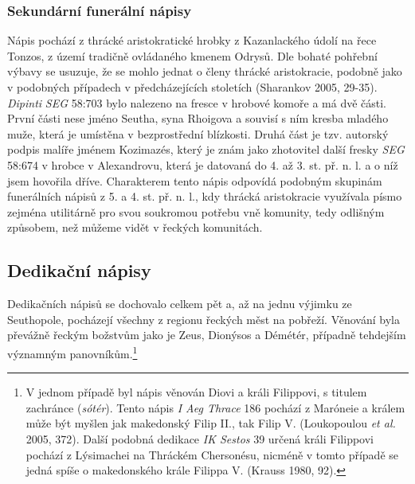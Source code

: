 \subsubsection[sekundární-funerální-nápisy-2]{Sekundární funerální nápisy}

Nápis pochází z thrácké aristokratické hrobky z Kazanlackého údolí na řece Tonzos, z území tradičně ovládaného kmenem Odrysů. Dle bohaté pohřební výbavy se usuzuje, že se mohlo jednat o členy thrácké aristokracie, podobně jako v podobných případech v předcházejících stoletích (Sharankov 2005, 29-35). {\em Dipinti} {\em SEG} 58:703 bylo nalezeno na fresce v hrobové komoře a má dvě části. První části nese jméno Seutha, syna Rhoigova a souvisí s ním kresba mladého muže, která je umístěna v bezprostřední blízkosti. Druhá část je tzv. autorský podpis malíře jménem Kozimazés, který je znám jako zhotovitel další fresky {\em SEG} 58:674 v hrobce v Alexandrovu, která je datovaná do 4. až 3. st. př. n. l. a o níž jsem hovořila dříve. Charakterem tento nápis odpovídá podobným skupinám funerálních nápisů z 5. a 4. st. př. n. l., kdy thrácká aristokracie využívala písmo zejména utilitárně pro svou soukromou potřebu vně komunity, tedy odlišným způsobem, než můžeme vidět v řeckých komunitách.

\subsection[dedikační-nápisy-5]{Dedikační nápisy}

Dedikačních nápisů se dochovalo celkem pět a, až na jednu výjimku ze Seuthopole, pocházejí všechny z regionu řeckých měst na pobřeží. Věnování byla převážně řeckým božstvům jako je Zeus, Dionýsos a Démétér, případně tehdejším významným panovníkům.\footnote{V jednom případě byl nápis věnován Diovi a králi Filippovi, s titulem zachránce ({\em sótér}). Tento nápis {\em I Aeg Thrace} 186 pochází z Maróneie a králem může být myšlen jak makedonský Filip II., tak Filip V. (Loukopoulou {\em et al.} 2005, 372). Další podobná dedikace {\em IK Sestos} 39 určená králi Filippovi pochází z Lýsimachei na Thráckém Chersonésu, nicméně v tomto případě se jedná spíše o makedonského krále Filippa V. (Krauss 1980, 92).}

